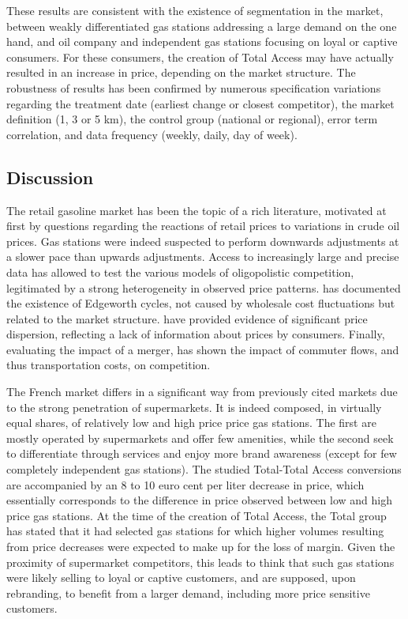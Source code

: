 \documentclass[english]{article}
\begin{document}
These results are consistent with the existence of segmentation in the market, between weakly differentiated gas stations addressing a large demand on the one hand, and oil company and independent gas stations focusing on loyal or captive consumers. For these consumers, the creation of Total Access may have actually resulted in an increase in price, depending on the market structure. The robustness of results has been confirmed by numerous specification variations regarding the treatment date (earliest change or closest competitor), the market definition (1, 3 or 5 km), the control group (national or regional), error term correlation, and data frequency (weekly, daily, day of week).

\subsection{Discussion}

The retail gasoline market has been the topic of a rich literature, motivated at first by questions regarding the reactions of retail prices to variations in crude oil prices. Gas stations were indeed suspected to perform downwards adjustments at a slower pace than upwards adjustments. Access to increasingly large and precise data has allowed to test the various models of oligopolistic competition, legitimated by a strong heterogeneity in observed price patterns. \cite{ECK13} has documented the existence of Edgeworth cycles, not caused by wholesale cost fluctuations but related to the market structure. \cite{CHA11} have provided evidence of significant price dispersion, reflecting a lack of information about prices by consumers. Finally, evaluating the impact of a merger, \cite{HOU12} has shown the impact of commuter flows, and thus transportation costs, on competition.

The French market differs in a significant way from previously cited markets due to the strong penetration of supermarkets. It is indeed composed, in virtually equal shares, of relatively low and high price price gas stations. The first are mostly operated by supermarkets and offer few amenities, while the second seek to differentiate through services and enjoy more brand awareness (except for few completely independent gas stations). The studied Total-Total Access conversions are accompanied by an 8 to 10 euro cent per liter decrease in price, which essentially corresponds to the difference in price observed between low and high price gas stations. At the time of the creation of Total Access, the Total group has stated that it had selected gas stations for which higher volumes resulting from price decreases were expected to make up for the loss of margin. Given the proximity of supermarket competitors, this leads to think that such gas stations were likely selling to loyal or captive customers, and are supposed, upon rebranding, to benefit from a larger demand, including more price sensitive customers.
\end{document}

